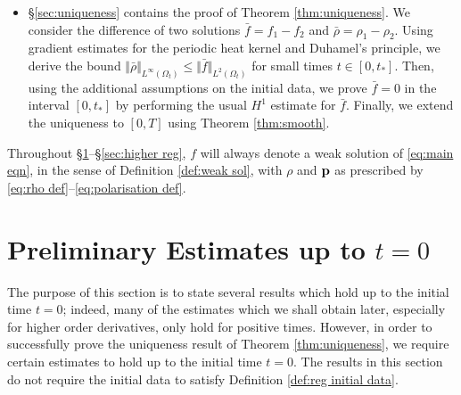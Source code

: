 \documentclass[11pt,a4paper,reqno]{amsart}
\theoremstyle{remark}
\theoremstyle{definition}
\numberwithin{equation}{section}
\newcommand{\p}{{\bf p}}
\begin{document}
\begin{itemize}
    \item[(v)] \S \ref{sec:uniqueness} contains the proof of Theorem \ref{thm:uniqueness}. We consider the difference of two solutions $\bar{f} = f_1-f_2$ and $\bar{\rho} = \rho_1-\rho_2$. Using gradient estimates for the periodic heat kernel and Duhamel's principle, we derive the bound $\Vert \bar{\rho} \Vert_{L^\infty(\Omega_t)} \leq \Vert \bar{f} \Vert_{L^2(\Omega_t)}$ for small times $t \in [0,t_*]$. Then, using the additional assumptions on the initial data, we prove $\bar{f} = 0$ in the interval $[0,t_*]$ by performing the usual $H^1$ estimate for $\bar{f}$. Finally, we extend the uniqueness to $[0,T]$ using Theorem \ref{thm:smooth}. 
\end{itemize}



Throughout \S\ref{subsec:angle averaged quantities}--\S\ref{sec:higher reg}, $f$ will always denote a weak solution of \eqref{eq:main eqn}, in the sense of Definition \ref{def:weak sol}, with $\rho$ and $\p$ as prescribed by \eqref{eq:rho def}--\eqref{eq:polarisation def}.

\section{Preliminary Estimates up to $t=0$}\label{subsec:angle averaged quantities}


The purpose of this section is to state several results which hold up to the initial time $t=0$; indeed, many of the estimates which we shall obtain later, especially for higher order derivatives, only hold for positive times. However, in order to successfully prove the uniqueness result of Theorem \ref{thm:uniqueness}, we require certain estimates to hold up to the initial time $t=0$. The results in this section do not require the initial data to satisfy Definition \ref{def:reg initial data}. 
\end{document}
